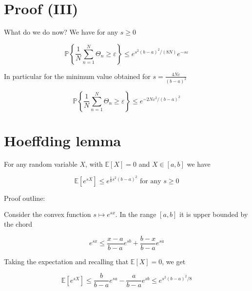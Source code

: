 \section*{Proof (III)}
What do we do now? We have for any $s \geq 0$

$$
\mathbb{P}\left\{\frac{1}{N} \sum_{n=1}^{N} \Theta_{n} \geq \varepsilon\right\} \leq e^{s^{2}(b-a)^{2} /(8 N)} e^{-s \varepsilon}
$$

In particular for the minimum value obtained for $s=\frac{4 N \varepsilon}{(b-a)^{2}}$

$$
\mathbb{P}\left\{\frac{1}{N} \sum_{n=1}^{N} \Theta_{n} \geq \varepsilon\right\} \leq e^{-2 N \varepsilon^{2} /(b-a)^{2}}
$$

\section*{Hoeffding lemma}
For any random variable $X$, with $\mathbb{E}[X]=0$ and $X \in[a, b]$ we have

$$
\mathbb{E}\left[e^{s X}\right] \leq e^{\frac{1}{8} s^{2}(b-a)^{2}} \text { for any } s \geq 0
$$

Proof outline:

Consider the convex function $s \mapsto e^{s x}$. In the range $[a, b]$ it is upper bounded by the chord

$$
e^{s x} \leq \frac{x-a}{b-a} e^{s b}+\frac{b-x}{b-a} e^{s a}
$$

Taking the expectation and recalling that $\mathbb{E}[X]=0$, we get

$$
\mathbb{E}\left[e^{s X}\right] \leq \frac{b}{b-a} e^{s a}-\frac{a}{b-a} e^{s b} \leq e^{s^{2}(b-a)^{2} / 8}
$$
